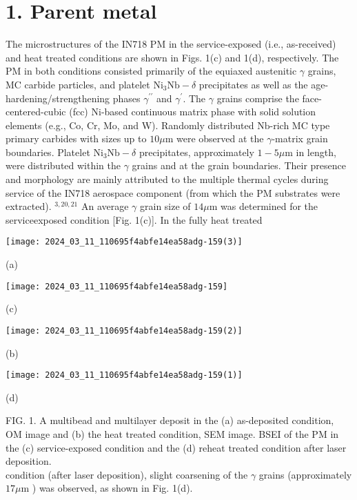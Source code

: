 \documentclass[10pt]{article}
\begin{document}
\section*{1. Parent metal}
The microstructures of the IN718 PM in the service-exposed (i.e., as-received) and heat treated conditions are shown in Figs. 1(c) and 1(d), respectively. The PM in both conditions consisted primarily of the equiaxed austenitic $\gamma$ grains, MC carbide particles, and platelet $\mathrm{Ni}_{3} \mathrm{Nb}-\delta$ precipitates as well as the age-hardening/strengthening phases $\gamma^{\prime \prime}$ and $\gamma^{\prime}$. The $\gamma$ grains comprise the face-centered-cubic (fcc) $\mathrm{Ni}$-based continuous matrix phase with solid solution elements (e.g., Co, Cr, Mo, and W). Randomly distributed $\mathrm{Nb}$-rich MC type primary carbides with sizes up to $10 \mu \mathrm{m}$ were observed at the $\gamma$-matrix grain boundaries. Platelet $\mathrm{Ni}_{3} \mathrm{Nb}-\delta$ precipitates, approximately $1-5 \mu \mathrm{m}$ in length, were distributed within the $\gamma$ grains and at the grain boundaries. Their presence and morphology are mainly attributed to the multiple thermal cycles during service of the IN718 aerospace component (from which the PM substrates were extracted). ${ }^{3,20,21}$ An average $\gamma$ grain size of $14 \mu \mathrm{m}$ was determined for the serviceexposed condition [Fig. 1(c)]. In the fully heat treated

\begin{center}
\texttt{[image: 2024\_03\_11\_110695f4abfe14ea58adg-159(3)]}
\end{center}

(a)

\begin{center}
\texttt{[image: 2024\_03\_11\_110695f4abfe14ea58adg-159]}
\end{center}

(c)

\begin{center}
\texttt{[image: 2024\_03\_11\_110695f4abfe14ea58adg-159(2)]}
\end{center}

(b)

\begin{center}
\texttt{[image: 2024\_03\_11\_110695f4abfe14ea58adg-159(1)]}
\end{center}

(d)

FIG. 1. A multibead and multilayer deposit in the (a) as-deposited condition, OM image and (b) the heat treated condition, SEM image. BSEI of the PM in the (c) service-exposed condition and the (d) reheat treated condition after laser deposition.\\
condition (after laser deposition), slight coarsening of the $\gamma$ grains (approximately $17 \mu \mathrm{m}$ ) was observed, as shown in Fig. 1(d).
\end{document}
